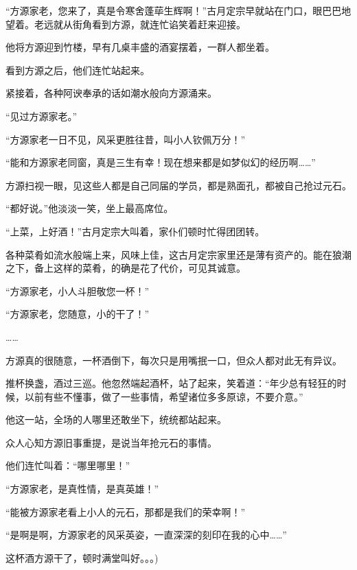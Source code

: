 \begin{this_body}
“方源家老，您来了，真是令寒舍蓬荜生辉啊！”古月定宗早就站在门口，眼巴巴地望着。老远就从街角看到方源，就连忙谄笑着赶来迎接。

他将方源迎到竹楼，早有几桌丰盛的酒宴摆着，一群人都坐着。

看到方源之后，他们连忙站起来。

紧接着，各种阿谀奉承的话如潮水般向方源涌来。

“见过方源家老。”

“方源家老一日不见，风采更胜往昔，叫小人钦佩万分！”

“能和方源家老同窗，真是三生有幸！现在想来都是如梦似幻的经历啊……”

方源扫视一眼，见这些人都是自己同届的学员，都是熟面孔，都被自己抢过元石。

“都好说。”他淡淡一笑，坐上最高席位。

“上菜，上好酒！”古月定宗大叫着，家仆们顿时忙得团团转。

各种菜肴如流水般端上来，风味上佳，这古月定宗家里还是薄有资产的。能在狼潮之下，备上这样的菜肴，的确是花了代价，可见其诚意。

“方源家老，小人斗胆敬您一杯！”

“方源家老，您随意，小的干了！”

……

方源真的很随意，一杯酒倒下，每次只是用嘴抿一口，但众人都对此无有异议。

推杯换盏，酒过三巡。他忽然端起酒杯，站了起来，笑着道：“年少总有轻狂的时候，以前有些不懂事，做了一些事情，希望诸位多多原谅，不要介意。”

他这一站，全场的人哪里还敢坐下，统统都站起来。

众人心知方源旧事重提，是说当年抢元石的事情。

他们连忙叫着：“哪里哪里！”

“方源家老，是真性情，是真英雄！”

“能被方源家老看上小人的元石，那都是我们的荣幸啊！”

“是啊是啊，方源家老的风采英姿，一直深深的刻印在我的心中……”

这杯酒方源干了，顿时满堂叫好。。。)

\end{this_body}

